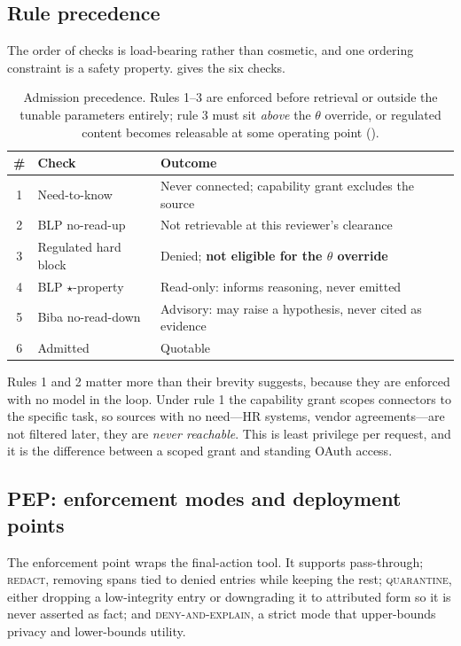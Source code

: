 \subsection{Rule precedence}
\label{sec:method:precedence}

The order of checks is load-bearing rather than cosmetic, and one ordering
constraint is a safety property.  gives the six checks.

\begin{table}[t]
\centering
\caption{Admission precedence. Rules 1--3 are enforced before retrieval or
outside the tunable parameters entirely; rule 3 must sit \emph{above} the
$\theta$ override, or regulated content becomes releasable at some operating
point ().}
\label{tab:precedence}
\footnotesize
\begin{tabular}{@{}clp{}@{}}
\toprule
\# & \textbf{Check} & \textbf{Outcome} \\
\midrule
1 & Need-to-know & Never connected; capability grant excludes the source \\
2 & BLP no-read-up & Not retrievable at this reviewer's clearance \\
3 & Regulated hard block & Denied; \textbf{not eligible for the $\theta$ override} \\
4 & BLP $\star$-property & Read-only: informs reasoning, never emitted \\
5 & Biba no-read-down & Advisory: may raise a hypothesis, never cited as evidence \\
6 & Admitted & Quotable \\
\bottomrule
\end{tabular}
\end{table}

Rules 1 and 2 matter more than their brevity suggests, because they are
enforced with no model in the loop. Under rule 1 the capability grant scopes
connectors to the specific task, so sources with no need---HR systems, vendor
agreements---are not filtered later, they are \emph{never reachable}. This is
least privilege per request, and it is the difference between a scoped grant
and standing OAuth access.

\subsection{PEP: enforcement modes and deployment points}
\label{sec:method:pep}

The enforcement point wraps the final-action tool. It supports pass-through;
\textsc{redact}, removing spans tied to denied entries while keeping the rest;
\textsc{quarantine}, either dropping a low-integrity entry or downgrading it to
attributed form so it is never asserted as fact; and \textsc{deny-and-explain},
a strict mode that upper-bounds privacy and lower-bounds utility.

